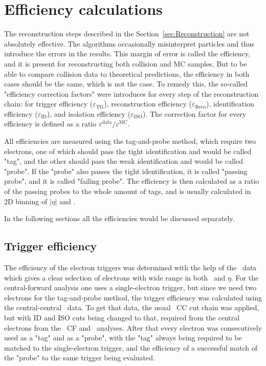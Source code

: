 \chapter{Efficiency calculations}
\label{sec:Efficiency}

The reconstruction steps described in the Section~\ref{sec:Reconstruction} are not absolutely effective. The algorithms occasionally misinterpret particles and thus introduce the errors in the results. This margin of error is called the efficiency, and it is present for reconstructing both collision and MC samples. But to be able to compare collision data to theoretical predictions, the efficiency in both cases should be the same, which is not the case. To remedy this, the so-called "efficiency correction factors" were introduces for every step of the reconstruction chain: for trigger efficiency ($\varepsilon_\mathrm{TG}$), reconstruction efficiency ($\varepsilon_\mathrm{Reco}$), identification efficiency ($\varepsilon_\mathrm{ID}$), and isolation efficiency ($\varepsilon_\mathrm{ISO}$). The correction factor for every efficiency is defined as a ratio $\varepsilon^\mathrm{data}/\varepsilon^\mathrm{MC}$.

All efficiencies are measured using the tag-and-probe method, which require two electrons, one of which should pass the tight identification and would be called "tag", and the other should pass the weak identification and would be called "probe". If the "probe" also passes the tight identification, it is called "passing probe", and it is called "failing probe". The efficiency is then calculated as a ratio of the passing probes to the whole amount of tags, and is usually calculated in 2D binning of $|\eta|$ and \pt.

In the following sections all the efficiencies would be discussed separately.

\section{Trigger efficiency}

The efficiency of the electron triggers was determined with the help of the \Zee\ data which gives a clear selection of electrons with wide range in both \pt\ and $\eta$. For the central-forward analysis one uses a single-electron trigger, but since we need two electrons for the tag-and-probe method, the trigger efficiency was calculated using the central-central \Zee\ data. To get that data, the usual \Zee\ CC cut chain was applied, but with ID and ISO cuts being changed to that, required from the central electrons from the \Zee\ CF and \Wenu\ analyses. After that every electron was consecutively used as a "tag" and as a "probe", with the "tag" always being required to be matched to the single-electron trigger, and the efficiency of a successful match of the "probe" to the same trigger being evaluated.

